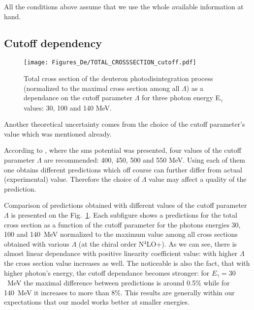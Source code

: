    All the conditions above assume that we use the whole available information at hand.
    


    \subsection*{Cutoff dependency}



    \begin{figure}[htb]
        \begin{center}
            \texttt{[image: Figures\_De/TOTAL\_CROSSSECTION\_cutoff.pdf]}
        \end{center}
        \caption{Total cross section of the deuteron photodisintegration
        process (normalized to the maximal cross section among all $\Lambda$)
        as a dependance on the cutoff parameter $\Lambda$ 
        for three photon energy E$_\gamma$ values: 30, 100 and 140 MeV.}
        \label{Cutoff_dep}
        \end{figure}

    Another theoretical uncertainty comes from the choice of the cutoff parameter's value 
    which was mentioned already.

   According to \cite{reinkrebs2018}, where the \gls{sms} potential was presented,
   four values of the cutoff parameter $\Lambda$ are recommended: 400, 450, 500 and 550 MeV.
   Using each of them one obtains different predictions which off course can further differ 
   from actual (experimental) value. Therefore the choice of $\Lambda$ value
   may affect a quality of the prediction.


    Comparison of predictions obtained with different values of the 
    cutoff parameter $\Lambda$ is presented on the Fig.~\ref{Cutoff_dep}.
    Each subfigure shows a predictions for the total cross section as 
    a function of the cutoff parameter for the photons energies 30, 100 and 140~MeV
    normalized to the maximum value among all cross sections
    obtained with various $\Lambda$ 
    (at the chiral order N$^4$LO+).
    As we can see,
    there is almost linear dependance with positive linearity coefficient value:
    with higher $\Lambda$ the cross section value increases as well.
    The noticeable is also the fact, that with higher photon's energy,
    the cutoff dependance becomes stronger: for $E_\gamma=30$~MeV
    the maximal difference between predictions is around 0.5\% while
    for 140~MeV it increases to more than 8\%. This results are
    generally within our expectations that our model works better at
    smaller energies. 



